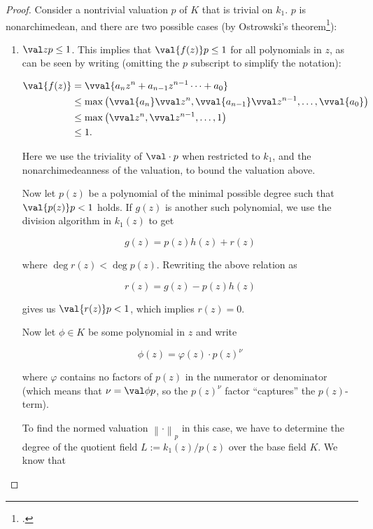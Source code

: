 \begin{proof}
  Consider a nontrivial valuation $p$ of $K$ that is trivial on $k_1$. $p$ is
  nonarchimedean, and there are two possible cases (by Ostrowski's
  theorem\footcite{kcnrdostrowskift}):

  \begin{enumerate}
  \item $\val z p \leq 1$. This implies that $\val {f(z)} p \leq 1$ for all
    polynomials in $z$, as can be seen by writing (omitting the $p$ subscript to
    simplify the notation):

    \begin{align*}
      \val {f(z)} &=    \vval {a_nz^n + a_{n-1}z^{n-1} \cdots + a_0} \\
                  &\leq \max{\left( \vval {a_n} \vval z ^n, \vval {a_{n-1}}\vval z^{n-1}, \ldots, \vval {a_0} \right)} \\
                  &\leq \max{\left( \vval z ^n, \vval z^{n-1}, \ldots, 1 \right)} \\
                  &\leq 1.
    \end{align*}

    Here we use the triviality of $\val \cdot p$ when restricted to $k_1$, and
    the nonarchimedeanness of the valuation, to bound the valuation above.

    Now let $p(z)$ be a polynomial of the minimal possible
    degree such that $\val {p(z)} p < 1$ holds. If $g(z)$ is another such
    polynomial, we use the division algorithm in $k_1(z)$ to get

    \[ g(z) = p(z)h(z) + r(z) \]

    where $\deg r(z) < \deg p(z)$. Rewriting the above relation as

    \[ r(z) = g(z) - p(z)h(z) \]

    gives us $\val {r(z)} p < 1$, which implies $r(z) = 0$.

    Now let $\phi \in K$ be some polynomial in $z$ and write

    \[ \phi(z) = \varphi(z) \cdot p(z)^\nu \]

    where $\varphi$ contains no factors of $p(z)$ in the numerator or denominator
    (which means that $\nu = \val \phi p$, so the $p(z)^\nu$ factor ``captures''
    the $p(z)$-term).

    To find the normed valuation ${ \left\lVert \cdot \right\rVert }_p$ in this case,
    we have to determine the degree of the quotient field $L := k_1(z)/p(z)$ over
    the base field $K$. We know that


\end{enumerate}
\end{proof}
